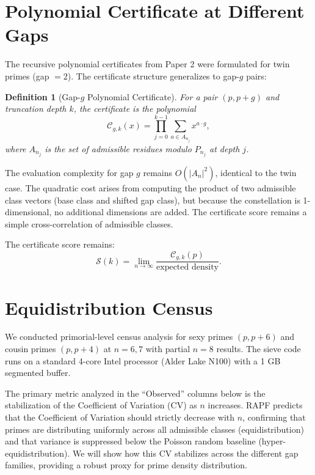 \documentclass[10pt,a4paper]{article}
\newtheorem{definition}[lemma]{Definition}
\theoremstyle{remark}
\begin{document}
\section{Polynomial Certificate at Different Gaps}

The recursive polynomial certificates from Paper 2 were formulated for twin primes
(gap $= 2$). The certificate structure generalizes to gap-$g$ pairs:

\begin{definition}[Gap-$g$ Polynomial Certificate]
For a pair $(p, p+g)$ and truncation depth $k$, the certificate is the polynomial
\begin{equation}
    \mathcal{C}_{g,k}(x) = \prod_{j=0}^{k-1} \sum_{a \in A_{n_j}} x^{a \cdot g},
\end{equation}
where $A_{n_j}$ is the set of admissible residues modulo $P_{n_j}$ at depth $j$.
\end{definition}

The evaluation complexity for gap $g$ remains $O(|A_{n}|^2)$, identical to the twin case. 
The quadratic cost arises from computing the product of two admissible class vectors 
(base class and shifted gap class), but because the constellation is 1-dimensional, 
no additional dimensions are added. The certificate score remains a simple 
cross-correlation of admissible classes.

The certificate score remains:
\begin{equation}
    \mathcal{S}(k) = \lim_{n \to \infty} \frac{\mathcal{C}_{g,k}(p)}{\text{expected density}}.
\end{equation}

\section{Equidistribution Census}

We conducted primorial-level census analysis for sexy primes $(p, p+6)$ and cousin primes
$(p, p+4)$ at $n = 6, 7$ with partial $n = 8$ results. The sieve code runs on a standard
4-core Intel processor (Alder Lake N100) with a 1 GB segmented buffer.

The primary metric analyzed in the ``Observed'' columns below is the stabilization of the 
Coefficient of Variation (CV) as $n$ increases. RAPF predicts that the Coefficient of 
Variation should strictly decrease with $n$, confirming that primes are distributing 
uniformly across all admissible classes (equidistribution) and that variance is suppressed 
below the Poisson random baseline (hyper-equidistribution). We will show how this CV 
stabilizes across the different gap families, providing a robust proxy for prime density 
distribution.
\end{document}
